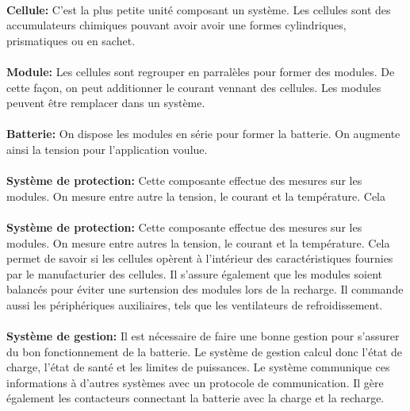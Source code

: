 		\paragraph{}
		\textbf{Cellule:} C'est la plus petite unité composant un système. Les cellules sont des accumulateurs chimiques pouvant avoir avoir une formes cylindriques, prismatiques ou en sachet.  
		
		\paragraph{}
		\textbf{Module:} Les cellules sont regrouper en parralèles pour former des modules. De cette façon, on peut additionner le courant vennant des cellules. Les modules peuvent être remplacer dans un système.
		
		\paragraph{}
		\textbf{Batterie:} On dispose les modules en série pour former la batterie. On augmente ainsi la tension pour l'application voulue.
		
		\paragraph{}
		\textbf{Système de protection:} Cette composante effectue des mesures sur les modules. On mesure entre autre la tension, le courant et la température. Cela 
			
		\paragraph{}
		\textbf{Système de protection:} Cette composante effectue des mesures sur les modules. On mesure entre autres la tension, le courant et la température. Cela permet de savoir si les cellules opèrent à l'intérieur des caractéristiques fournies par le manufacturier des cellules. Il s'assure également que les modules soient balancés pour éviter une surtension des modules lors de la recharge. Il commande aussi les périphériques auxiliaires, tels que les ventilateurs de refroidissement.
					
		\paragraph{}
		\textbf{Système de gestion:} Il est nécessaire de faire une bonne gestion pour s'assurer du bon fonctionnement de la batterie. Le système de gestion calcul donc l'état de charge, l'état de santé et les limites de puissances. Le système communique ces informations à d'autres systèmes avec un protocole de communication. Il gère également les contacteurs connectant la batterie avec la charge et la recharge.
			
